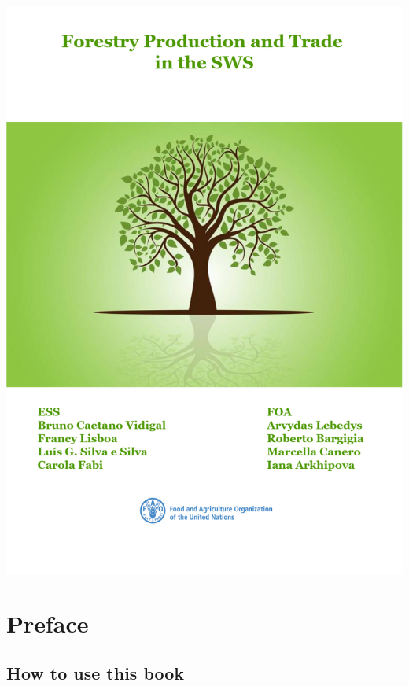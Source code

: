 \documentclass[
]{book}
\begin{document}
\begin{center}\includegraphics{images/forestry_cover_book} \end{center}

\hypertarget{preface}{%
\chapter*{\texorpdfstring{\textbf{Preface}}{Preface}}\label{preface}}

\hypertarget{how-to-use-this-book}{%
\section*{\texorpdfstring{\textbf{How to use this book}}{How to use this book}}\label{how-to-use-this-book}}
\end{document}
